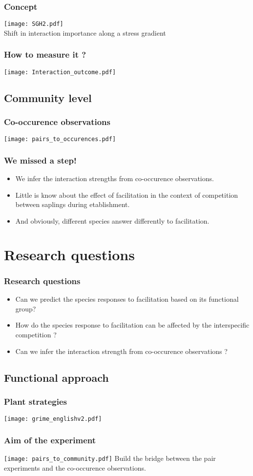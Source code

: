 \documentclass{beamer}[12pt]
\begin{document}
\begin{frame}\frametitle{Concept}
\texttt{[image: SGH2.pdf]} \\
\vfill
Shift in interaction importance along a stress gradient
\end{frame}

\begin{frame}\frametitle{How to measure it ?}
	\texttt{[image: Interaction\_outcome.pdf]}
\end{frame}

\subsection{Community level}
\begin{frame}\frametitle{Co-occurence observations}
	\texttt{[image: pairs\_to\_occurences.pdf]}
\end{frame}
\begin{frame}\frametitle{We missed a step!}
	\begin{itemize}
		\item We infer the interaction strengths from co-occurence observations.
		\item Little is know about the effect of facilitation in the context of competition between saplings during etablishment.
		\item And obviously, different species answer differently to facilitation. 
	\end{itemize}
\end{frame}

\section{Research questions}
\begin{frame}\frametitle{Research questions}
	\begin{itemize}
		\item Can we predict the species responses to facilitation based on its functional group? 
		\item How do the species response to facilitation can be affected by the interspecific competition ?
		\item Can we infer the interaction strength from co-occurence observations ?
	\end{itemize}
\end{frame}

\subsection{Functional approach}
\begin{frame}\frametitle{Plant strategies}
	\texttt{[image: grime\_englishv2.pdf]}
\end{frame}
\begin{frame}\frametitle{Aim of the experiment}
	\texttt{[image: pairs\_to\_community.pdf]}
	\vfill
	Build the bridge between the pair experiments and the co-occurence observations.
\end{frame}
\end{document}

